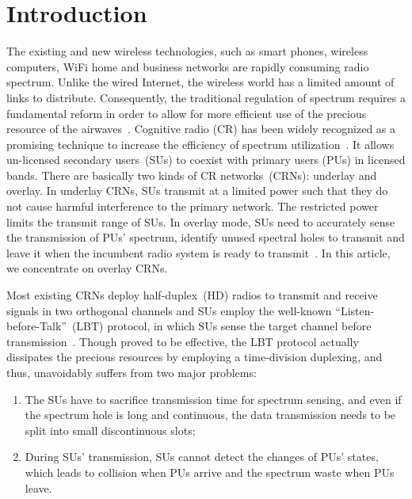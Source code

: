 \documentclass[onecolumn,12pt]{IEEEtran}
\begin{document}
\newpage

\section{Introduction}

The existing and new wireless technologies, such as smart phones, wireless computers, WiFi home and business networks are rapidly consuming radio spectrum. Unlike the wired Internet, the wireless world has a limited amount of links to distribute. Consequently, the traditional regulation of spectrum requires a fundamental reform in order to allow for more efficient  use of the precious resource of the airwaves~\cite{Song2010}. Cognitive radio (CR) has been widely recognized as a promising technique to increase the efficiency of spectrum utilization~\cite{mitola1999cognitive}. It allows un-licensed secondary users~(SUs) to coexist with primary users (PUs) in licensed bands. There are basically two kinds of CR networks~(CRNs): underlay and overlay. In underlay CRNs, SUs transmit at a limited power such that they do not cause harmful interference to the primary network. The restricted power limits the transmit range of SUs. In overlay mode, SUs need to accurately sense the transmission of PUs' spectrum, identify unused spectral holes to transmit and leave it when the incumbent radio system is ready to transmit~\cite{yucek2009survey}. In this article, we concentrate on overlay CRNs.

Most existing CRNs deploy half-duplex~(HD) radios to transmit and receive signals in two orthogonal channels and SUs employ the well-known ``Listen-before-Talk''~(LBT) protocol, in which SUs sense the target channel before transmission~\cite{yucek2009survey}. Though proved to be effective, the LBT protocol actually dissipates the precious resources by employing a time-division duplexing, and thus, unavoidably suffers from two major problems:
\begin{enumerate}
  \item The SUs have to sacrifice transmission time for spectrum sensing, and even if the spectrum hole is long and continuous, the data transmission needs to be split into small discontinuous slots;
  \item During SUs' transmission, SUs cannot detect the changes of PUs' states, which leads to collision when PUs arrive and the spectrum waste when PUs leave.
\end{enumerate}
\end{document}
